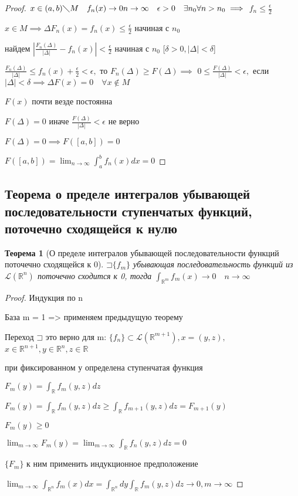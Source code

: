 \documentclass[a4paper]{article}
\newcommand\letsymbol{\mathord{\sqsupset}}
\newtheorem{theorem}{Теорема}[section]
\theoremstyle{definition}
\theoremstyle{remark}
\begin{document}
\begin{proof}
     $x\in(a, b)\diagdown M\quad f_n(x)\to 0 n\to\infty\quad \epsilon>0 \quad \exists n_0 \forall n > n_0\implies$
     $f_n\leq \frac{\epsilon}{2}$

     $x\in M \implies\Delta F_n(x) = f_n(x)\leq \frac{\epsilon}{2}$ начиная с $n_0$

     найдем $|\frac{F_n(\Delta)}{|\Delta|} - f_n(x)|< \frac{\epsilon}{2}$ начиная с $n_0$ [$\delta >0, |\Delta|<\delta$]

     $\frac{F_n(\Delta)}{|\Delta|}\leq f_n(x) + \frac{\epsilon}{2}< \epsilon,$ то $F_n(\Delta)\geq F(\Delta)\implies$
     $0\leq \frac{F(\Delta)}{|\Delta|}<\epsilon,$ если $|\Delta|<\delta\implies\Delta F(x) = 0 \quad \forall x\notin M$
     
     $F(x)$ почти везде постоянна

     $F(\Delta) = 0$ иначе $\frac{F(\Delta)}{|\Delta|}<\epsilon$ не верно

     $F(\Delta) = 0\implies F([a, b]) = 0$

     $F([a,b]) = \lim_{n\to\infty}\int_a^b f_n(x)dx = 0$
\end{proof}
    \subsection{ Теорема о пределе интегралов убывающей последовательности ступенчатых функций, поточечно сходящейся к нулю}
    \begin{theorem}[О пределе интегралов убывающей последовательности функций поточечно сходящейся к 0]
     $\letsymbol{}\{f_m\}$ убывающая последовательность функций из $\mathcal{L} (\mathbb{R} ^n)$
     поточечно сходится к 0, тогда $\int_{\mathbb{R} ^m}f_m(x)\to0 \quad n\to\infty$
\end{theorem}
\begin{proof}
     Индукция по n
     
     База m = 1 => применяем предыдущую теорему

     Переход $\letsymbol{}$ это верно для m: $\{f_n\}\subset\mathcal{L} (\mathbb{R} ^{m+1}), x = (y, z),$
     $x\in \mathbb{R} ^{n+1}, y\in \mathbb{R} ^n, z\in\mathbb{R} $

     при фиксированном у определена ступенчатая функция

     $F_m(y) = \int_\mathbb{R} f_m(y, z)dz$

     $F_m(y) = \int_\mathbb{R} f_m(y, z)dz\geq\int_\mathbb{R} f_{m+1}(y, z)dz = F_{m+1}(y)$

     $F_m(y)\geq 0$

     $\lim_{m\to\infty}F_m(y) = \lim_{m\to \infty}\int_\mathbb{R} f_n(y, z)dz = 0$

     $\{F_m\}$ к ним применить индукционное предположение

     $\lim_{m\to\infty}\int_{\mathbb{R} ^n}f_m(x)dx = \int_{\mathbb{R} ^n}dy \int_\mathbb{R} f_m(y,z)dz\to 0, m\to\infty$
\end{proof}
\end{document}
